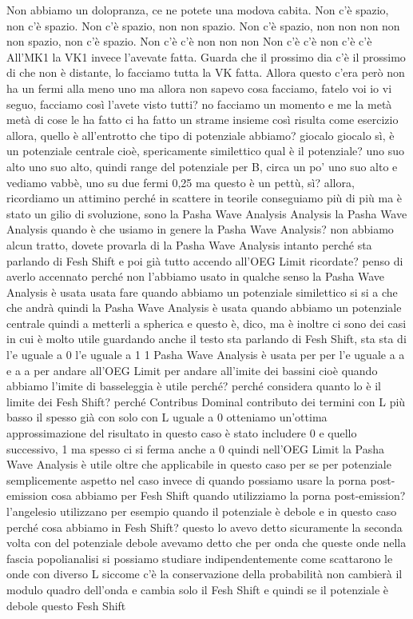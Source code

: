 \begin{soluzione}
   Non abbiamo un dolopranza, ce ne potete una modova cabita. Non c'è spazio, non c'è spazio. Non c'è spazio, non non spazio. Non c'è spazio, non non non non non spazio, non c'è spazio. Non c'è c'è non non non Non c'è c'è non c'è c'è  All'MK1 la VK1 invece l'avevate fatta. Guarda che il prossimo dia c'è il prossimo di che non è distante, lo facciamo tutta la VK fatta.  Allora                                                                                                                                questo c'era però non ha un fermi alla meno uno ma allora non sapevo cosa facciamo, fatelo voi io vi seguo, facciamo così l'avete visto tutti? no facciamo un momento e me la metà metà di cose le ha fatto ci ha fatto un strame insieme così risulta come esercizio allora, quello è all'entrotto che tipo di potenziale abbiamo? giocalo giocalo sì, è un potenziale centrale cioè, spericamente similettico qual è il potenziale? uno suo alto uno suo alto, quindi range del potenziale per B, circa un po' uno suo alto e vediamo vabbè, uno su due fermi 0,25 ma questo è un pettù, sì? allora, ricordiamo un attimino perché in scattere in teorile conseguiamo più di più ma è stato un gilio di svoluzione, sono la Pasha Wave Analysis Analysis la Pasha Wave Analysis quando è che usiamo in genere la Pasha Wave Analysis? non abbiamo alcun tratto, dovete provarla di la Pasha Wave Analysis intanto perché sta parlando di Fesh Shift e poi già tutto accendo all'OEG Limit ricordate? penso di averlo accennato perché non l'abbiamo usato in qualche senso la Pasha Wave Analysis è usata usata fare quando abbiamo un potenziale similettico si si a che che andrà quindi la Pasha Wave Analysis è usata quando abbiamo un potenziale centrale quindi a metterli a spherica e questo è, dico, ma è inoltre ci sono dei casi in cui è molto utile guardando anche il testo sta parlando di Fesh Shift, sta sta di l'e uguale a 0 l'e uguale a 1 1 Pasha Wave Analysis è usata per per l'e uguale a a e a a per andare all'OEG Limit per andare all'imite dei bassini cioè quando abbiamo l'imite di basseleggia è utile perché? perché considera quanto lo è il limite dei Fesh Shift? perché Contribus Dominal contributo dei termini con L più basso il spesso già con solo con L uguale a 0 otteniamo un'ottima approssimazione del risultato in questo caso è stato includere 0 e quello successivo, 1 ma spesso ci si ferma anche a 0 quindi nell'OEG Limit la Pasha Wave Analysis è utile oltre che applicabile in questo caso per se per potenziale semplicemente aspetto nel caso invece di quando possiamo usare la porna post-emission cosa abbiamo per Fesh Shift quando utilizziamo la porna post-emission? l'angelesio utilizzano per esempio quando il potenziale è debole e in questo caso perché cosa abbiamo in Fesh Shift? questo lo avevo detto sicuramente la seconda volta con del potenziale debole avevamo detto che per onda che queste onde nella fascia popolianalisi si possiamo studiare indipendentemente come scattarono le onde con diverso L siccome c'è la conservazione della probabilità non cambierà il modulo quadro dell'onda e cambia solo il Fesh Shift e quindi se il potenziale è debole questo Fesh Shift 
   

\end{soluzione}

